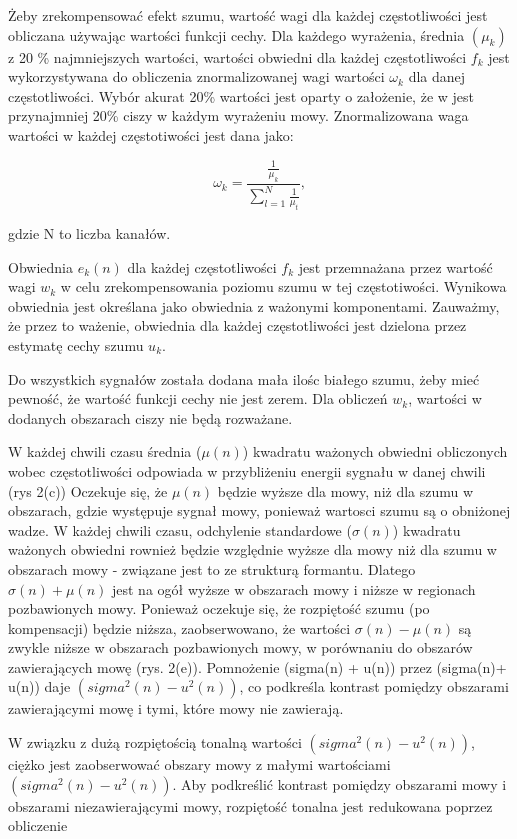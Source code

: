 \documentclass[eng,printmode]{mgr}
\begin{document}
  Żeby zrekompensować efekt szumu, wartość wagi dla każdej częstotliwości jest obliczana używając wartości funkcji cechy. Dla każdego wyrażenia, średnia $(\mu_{k})$ z 20 \% najmniejszych wartości, wartości obwiedni dla każdej częstotliwości $f_{k}$ jest wykorzystywana do obliczenia znormalizowanej wagi wartości $\omega_{k}$ dla danej częstotliwości. Wybór akurat 20\% wartości jest oparty o założenie, że w jest przynajmniej 20\% ciszy w każdym wyrażeniu mowy. Znormalizowana waga wartości w każdej częstotiwości jest dana jako:
  
  
  $$\omega_{k} = \frac{\frac{1}{\mu_{k}}}{\sum_{l=1}^{N}	\frac{1}{\mu_{t}}},$$
  
  gdzie N to liczba kanałów.
  
  Obwiednia $e_{k}(n)$ dla każdej częstotliwości $f_{k}$ jest przemnażana przez wartość wagi $w_{k}$ w celu zrekompensowania poziomu szumu w tej częstotiwości. Wynikowa obwiednia jest określana jako obwiednia z ważonymi komponentami. Zauważmy, że przez to ważenie, obwiednia dla każdej częstotliwości jest dzielona przez estymatę cechy szumu $u_{k}$. 
  
  Do wszystkich sygnałów została dodana mała ilośc białego szumu, żeby mieć pewność, że wartość funkcji cechy nie jest zerem. Dla obliczeń $w_{k}$, wartości w dodanych obszarach ciszy nie będą rozważane. 
  
  W każdej chwili czasu średnia ($\mu(n)$) kwadratu ważonych obwiedni obliczonych  wobec częstotliwości odpowiada w przybliżeniu energii sygnału w danej chwili (rys 2(c)) Oczekuje się, że $\mu(n)$ będzie wyższe dla mowy, niż dla szumu w obszarach, gdzie występuje sygnał mowy, ponieważ wartosci szumu są o obniżonej wadze. W każdej chwili czasu, odchylenie standardowe ($\sigma(n)$) kwadratu ważonych obwiedni rownież będzie względnie wyższe dla mowy niż dla szumu w obszarach mowy - związane jest to ze strukturą formantu. Dlatego $\sigma(n)+ \mu(n)$ jest na ogół wyższe w obszarach mowy i niższe w regionach pozbawionych mowy. Ponieważ oczekuje się, że rozpiętość szumu (po kompensacji) będzie niższa, zaobserwowano, że wartości $\sigma(n)-\mu(n)$ są zwykle niższe w obszarach pozbawionych mowy, w porównaniu do obszarów zawierających mowę (rys. 2(e)). Pomnożenie (sigma(n) + u(n)) przez (sigma(n)+ u(n)) daje $(sigma^2(n) - u^2(n))$, co podkreśla kontrast pomiędzy obszarami zawierającymi mowę i tymi, które mowy nie zawierają.
  
  W związku z dużą rozpiętością tonalną wartości $(sigma^2(n) - u^2(n))$, ciężko jest zaobserwować obszary mowy z małymi wartościami  $(sigma^2(n) - u^2(n))$. Aby podkreślić kontrast pomiędzy obszarami mowy i obszarami niezawierającymi mowy, rozpiętość tonalna jest redukowana poprzez obliczenie
  
\end{document}
